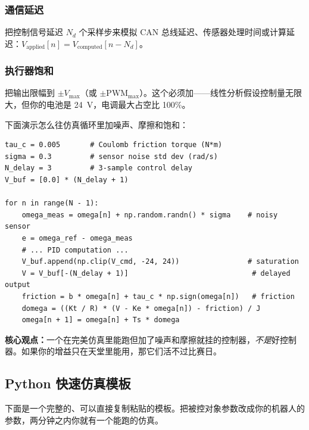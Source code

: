 \subsubsection{通信延迟}

把控制信号延迟 $N_d$ 个采样步来模拟 CAN 总线延迟、传感器处理时间或计算延迟：$V_{\text{applied}}[n] = V_{\text{computed}}[n - N_d]$。

\subsubsection{执行器饱和}

把输出限幅到 $\pm V_{\max}$（或 $\pm \text{PWM}_{\max}$）。这个必须加——线性分析假设控制量无限大，但你的电池是 24~V，电调最大占空比 100\%。

下面演示怎么往仿真循环里加噪声、摩擦和饱和：

\begin{verbatim}
tau_c = 0.005       # Coulomb friction torque (N*m)
sigma = 0.3         # sensor noise std dev (rad/s)
N_delay = 3         # 3-sample control delay
V_buf = [0.0] * (N_delay + 1)

for n in range(N - 1):
    omega_meas = omega[n] + np.random.randn() * sigma    # noisy sensor
    e = omega_ref - omega_meas
    # ... PID computation ...
    V_buf.append(np.clip(V_cmd, -24, 24))                # saturation
    V = V_buf[-(N_delay + 1)]                             # delayed output
    friction = b * omega[n] + tau_c * np.sign(omega[n])   # friction
    domega = ((Kt / R) * (V - Ke * omega[n]) - friction) / J
    omega[n + 1] = omega[n] + Ts * domega
\end{verbatim}

\textbf{核心观点：}一个在完美仿真里能跑但加了噪声和摩擦就挂的控制器，\textit{不是}好控制器。如果你的增益只在天堂里能用，那它们活不过比赛日。

\subsection{Python 快速仿真模板}

下面是一个完整的、可以直接复制粘贴的模板。把被控对象参数改成你的机器人的参数，两分钟之内你就有一个能跑的仿真。

